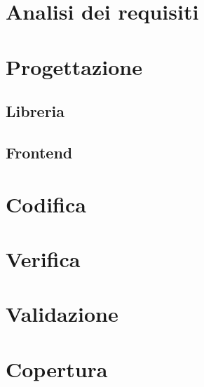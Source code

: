 \section{Analisi dei requisiti}

\section{Progettazione}
\subsection{Libreria}
\subsection{Frontend}
\section{Codifica}
\section{Verifica}
\section{Validazione}
\section{Copertura}
